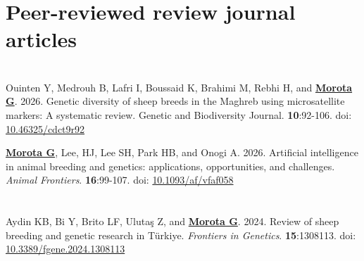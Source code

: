 \documentclass[margin,line,10pt]{res}
\newenvironment{list1}{
  \begin{list}{\ding{113}}{%
      \setlength{\itemsep}{0in}
      \setlength{\parsep}{0in} \setlength{\parskip}{0in}
      \setlength{\topsep}{0in} \setlength{\partopsep}{0in} 
      \setlength{\leftmargin}{0.17in}}}{\end{list}}
\begin{document}
\begin{resume}
\section{\sc Peer-reviewed review journal articles}

\vspace{1.5cm}


\section{}
\begin{list1}


  \item  [{\bf 8}.] Ouinten Y, Medrouh B, Lafri I, Boussaid K, Brahimi M, Rebhi H, and \textbf{\underline{Morota G}}. 2026. Genetic diversity of sheep breeds in the Maghreb using microsatellite markers: A systematic review. Genetic and Biodiversity Journal. \textbf{10}:92-106. doi: \textcolor{blue}{\href{https://doi.org/10.46325/cdct9r92}{10.46325/cdct9r92}}

  \vspace{0.5cm}

  \item  [{\bf 7}.] \textbf{\underline{Morota G}}, Lee, HJ, Lee SH, Park HB, and Onogi A. 2026. Artificial intelligence in animal breeding and genetics: applications, opportunities, and challenges. \emph{Animal Frontiers}. \textbf{16}:99-107. doi: \textcolor{blue}{\href{https://doi.org/10.1093/af/vfaf058}{10.1093/af/vfaf058}}

\end{list1}



\section{}
\begin{list1}

  \item  [{\bf 6}.] Aydin KB, Bi Y, Brito LF, Uluta\c{s} Z, and \textbf{\underline{Morota G}}. 2024. Review of sheep breeding and genetic research in T\"{u}rkiye. \emph{Frontiers in Genetics}. \textbf{15}:1308113. doi: \textcolor{blue}{\href{https://doi.org/10.3389/fgene.2024.1308113}{10.3389/fgene.2024.1308113}}

\end{list1}



\section{}
\begin{list1}


\end{list1}
\end{resume}
\end{document}
